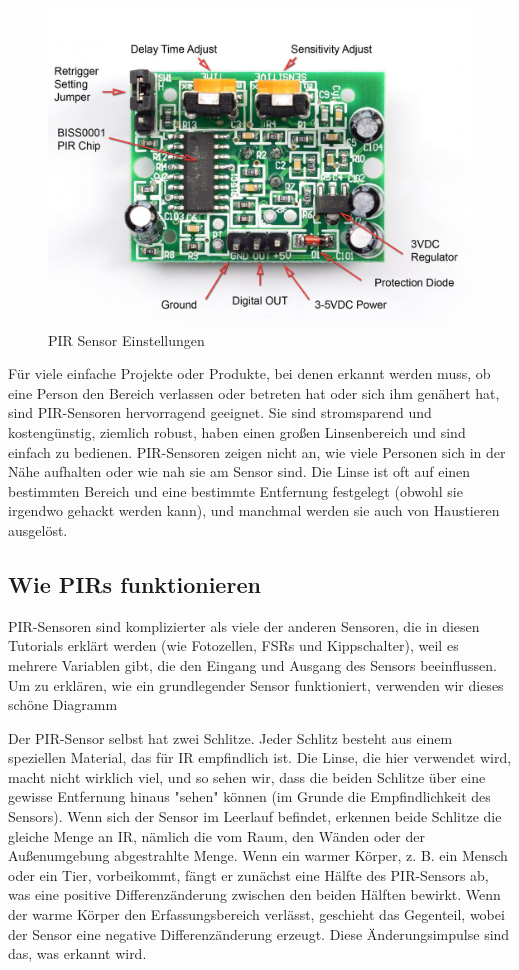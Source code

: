 \documentclass[conference]{IEEEtran}
\begin{document}
\begin{figure}
	\begin{center}
		\includegraphics[scale=0.15]{pir3}
	\end{center}
	\caption{PIR Sensor Einstellungen}
\end{figure}

Für viele einfache Projekte oder Produkte, bei denen erkannt werden muss, ob eine Person den Bereich verlassen oder betreten hat oder sich ihm genähert hat, sind PIR-Sensoren hervorragend geeignet. Sie sind stromsparend und kostengünstig, ziemlich robust, haben einen großen Linsenbereich und sind einfach zu bedienen.  PIR-Sensoren zeigen nicht an, wie viele Personen sich in der Nähe aufhalten oder wie nah sie am Sensor sind. Die Linse ist oft auf einen bestimmten Bereich und eine bestimmte Entfernung festgelegt (obwohl sie irgendwo gehackt werden kann), und manchmal werden sie auch von Haustieren ausgelöst.

\subsection{Wie PIRs funktionieren}
PIR-Sensoren sind komplizierter als viele der anderen Sensoren, die in diesen Tutorials erklärt werden (wie Fotozellen, FSRs und Kippschalter), weil es mehrere Variablen gibt, die den Eingang und Ausgang des Sensors beeinflussen. Um zu erklären, wie ein grundlegender Sensor funktioniert, verwenden wir dieses schöne Diagramm

Der PIR-Sensor selbst hat zwei Schlitze. Jeder Schlitz besteht aus einem speziellen Material, das für IR empfindlich ist. Die Linse, die hier verwendet wird, macht nicht wirklich viel, und so sehen wir, dass die beiden Schlitze über eine gewisse Entfernung hinaus "sehen" können (im Grunde die Empfindlichkeit des Sensors). Wenn sich der Sensor im Leerlauf befindet, erkennen beide Schlitze die gleiche Menge an IR, nämlich die vom Raum, den Wänden oder der Außenumgebung abgestrahlte Menge. Wenn ein warmer Körper, z. B. ein Mensch oder ein Tier, vorbeikommt, fängt er zunächst eine Hälfte des PIR-Sensors ab, was eine positive Differenzänderung zwischen den beiden Hälften bewirkt. Wenn der warme Körper den Erfassungsbereich verlässt, geschieht das Gegenteil, wobei der Sensor eine negative Differenzänderung erzeugt. Diese Änderungsimpulse sind das, was erkannt wird.
\end{document}
